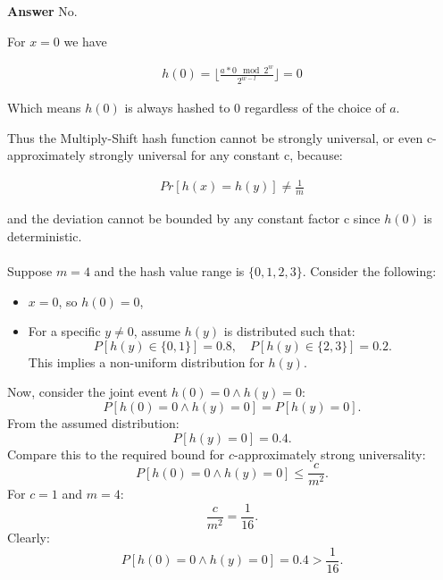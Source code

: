 \documentclass[12pt]{article}
\begin{document}
\textbf{Answer}
No. 

For $x=0$ we have 

\begin{equation}
\begin{aligned}
h(0) = \lfloor \frac{a * 0 \mod 2^w}{2^{w-l}} \rfloor = 0
\end{aligned}
\end{equation}

Which means $h(0)$ is always hashed to 0 regardless of the choice of $a$. 

Thus the Multiply-Shift hash function cannot be strongly universal, or even c-approximately strongly universal for any constant c, because:

\begin{equation}
\begin{aligned}
Pr[h(x)=h(y)] \neq \frac{1}{m}
\end{aligned}
\end{equation}

and the deviation cannot be bounded by any constant factor c since $h(0)$ is deterministic.\\
\\
Suppose $m = 4$ and the hash value range is $\{0, 1, 2, 3\}$. Consider the following:
\begin{itemize}
    \item $x = 0$, so $h(0) = 0$,
    \item For a specific $y \neq 0$, assume $h(y)$ is distributed such that:
    \[
    P[h(y) \in \{0, 1\}] = 0.8, \quad P[h(y) \in \{2, 3\}] = 0.2.
    \]
    This implies a non-uniform distribution for $h(y)$.
\end{itemize}
Now, consider the joint event $h(0) = 0 \wedge h(y) = 0$:
\[
P[h(0) = 0 \wedge h(y) = 0] = P[h(y) = 0].
\]
From the assumed distribution:
\[
P[h(y) = 0] = 0.4.
\]
Compare this to the required bound for $c$-approximately strong universality:
\[
P[h(0) = 0 \wedge h(y) = 0] \leq \frac{c}{m^2}.
\]
For $c = 1$ and $m = 4$:
\[
\frac{c}{m^2} = \frac{1}{16}.
\]
Clearly:
\[
P[h(0) = 0 \wedge h(y) = 0] = 0.4 > \frac{1}{16}.
\]
\end{document}
